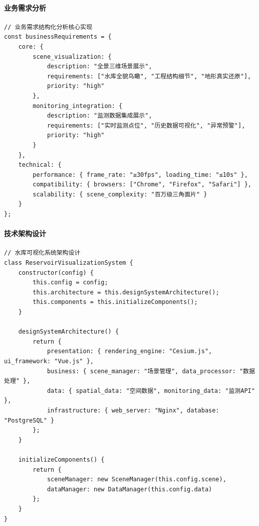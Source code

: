 \hypertarget{ux4e1aux52a1ux9700ux6c42ux5206ux6790}{%
\paragraph{业务需求分析}\label{ux4e1aux52a1ux9700ux6c42ux5206ux6790}}

\begin{lstlisting}[style=javascript]
// 业务需求结构化分析核心实现
const businessRequirements = {
    core: {
        scene_visualization: {
            description: "全景三维场景展示",
            requirements: ["水库全貌鸟瞰", "工程结构细节", "地形真实还原"],
            priority: "high"
        },
        monitoring_integration: {
            description: "监测数据集成展示", 
            requirements: ["实时监测点位", "历史数据可视化", "异常预警"],
            priority: "high"
        }
    },
    technical: {
        performance: { frame_rate: "≥30fps", loading_time: "≤10s" },
        compatibility: { browsers: ["Chrome", "Firefox", "Safari"] },
        scalability: { scene_complexity: "百万级三角面片" }
    }
};
\end{lstlisting}

\hypertarget{ux6280ux672fux67b6ux6784ux8bbeux8ba1}{%
\paragraph{技术架构设计}\label{ux6280ux672fux67b6ux6784ux8bbeux8ba1}}

\begin{lstlisting}[style=javascript]
// 水库可视化系统架构设计
class ReservoirVisualizationSystem {
    constructor(config) {
        this.config = config;
        this.architecture = this.designSystemArchitecture();
        this.components = this.initializeComponents();
    }
    
    designSystemArchitecture() {
        return {
            presentation: { rendering_engine: "Cesium.js", ui_framework: "Vue.js" },
            business: { scene_manager: "场景管理", data_processor: "数据处理" },
            data: { spatial_data: "空间数据", monitoring_data: "监测API" },
            infrastructure: { web_server: "Nginx", database: "PostgreSQL" }
        };
    }
    
    initializeComponents() {
        return {
            sceneManager: new SceneManager(this.config.scene),
            dataManager: new DataManager(this.config.data)
        };
    }
}
\end{lstlisting}


